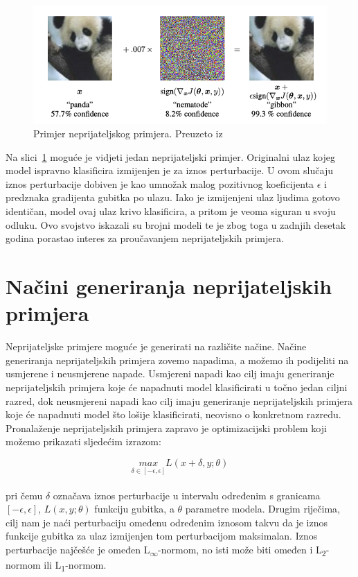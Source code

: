 \documentclass[times, utf8, zavrsni, numeric]{fer}
\begin{document}
\pagebreak

\begin{figure}[htb]
    \centering
    \includegraphics[scale=0.5]{adversarial_example.png}
    \caption{Primjer neprijateljskog primjera. Preuzeto iz~\cite{goodfellow2014explaining}}
    \label{fig:adv_example}
\end{figure}

Na slici~\ref{fig:adv_example} moguće je vidjeti jedan neprijateljski primjer.
Originalni ulaz kojeg model ispravno klasificira izmijenjen je za iznos perturbacije.
U ovom slučaju iznos perturbacije dobiven je kao umnožak malog pozitivnog koeficijenta $\epsilon$ i predznaka gradijenta gubitka po ulazu.
Iako je izmijenjeni ulaz ljudima gotovo identičan, model ovaj ulaz krivo klasificira, a pritom je veoma siguran u svoju odluku.
Ovo svojstvo iskazali su brojni modeli te je zbog toga u zadnjih desetak godina porastao interes za proučavanjem neprijateljskih primjera.

\section{Načini generiranja neprijateljskih primjera}

Neprijateljske primjere moguće je generirati na različite načine. 
Načine generiranja neprijateljskih primjera zovemo napadima, a možemo ih podijeliti na usmjerene i neusmjerene napade.
Usmjereni napadi kao cilj imaju generiranje neprijateljskih primjera koje će napadnuti model klasificirati u točno jedan ciljni razred,
dok neusmjereni napadi kao cilj imaju generiranje neprijateljskih primjera koje će napadnuti model što lošije klasificirati, neovisno o konkretnom razredu.
Pronalaženje neprijateljskih primjera zapravo je optimizacijski problem koji možemo prikazati sljedećim izrazom:

\begin{equation}
    \underset{\delta \in [-\epsilon, \epsilon]}{max}L(x + \delta,y;\theta)
    \label{eq:adversarial_optimization}
\end{equation}
\\
pri čemu $\delta$ označava iznos perturbacije u intervalu određenim s granicama $[-\epsilon, \epsilon]$, $L(x,y;\theta)$ funkciju gubitka, a $\theta$ parametre modela.
Drugim riječima, cilj nam je naći perturbaciju omeđenu određenim iznosom takvu da je iznos funkcije gubitka za ulaz izmijenjen tom perturbacijom maksimalan.
Iznos perturbacije najčešće je omeđen L\textsubscript{$\infty$}-normom, no isti može biti omeđen i L\textsubscript{2}-normom ili L\textsubscript{1}-normom.
\end{document}
